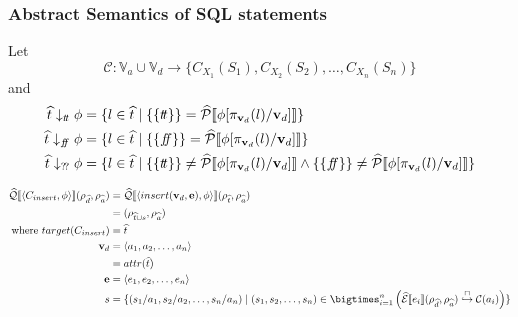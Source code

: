\subsubsection{Abstract Semantics of SQL statements}

Let
\begin{equation}
    \mathcal{C} : \mathbb{V}_a \cup \mathbb{V}_d \rightarrow \{ C_{X_1}(S_1), C_{X_2}(S_2), \dots, C_{X_n}(S_n) \}
\end{equation}
and
\begin{align}
    \abstable \downarrow_{\true} \phi &= \{ l \in \ab{t} \mid \{\{ \true \}\} = \abspredsem{\phi[\pi_{\mathbf{v}_d}(l)/\mathbf{v}_d]} \} \\
    \abstable \downarrow_{\false} \phi &= \{ l \in \ab{t} \mid \{\{ \false \}\} = \abspredsem{\phi[\pi_{\mathbf{v}_d}(l)/\mathbf{v}_d]} \} \\
    \abstable \downarrow_{\unknown} \phi &= \{ l \in \ab{t} \mid \{\{ \true \}\} \neq \abspredsem{\phi[\pi_{\mathbf{v}_d}(l)/\mathbf{v}_d]} \land \{\{ \false \}\} \neq \abspredsem{\phi[\pi_{\mathbf{v}_d}(l)/\mathbf{v}_d]}\} \\
\end{align}

\begin{align}
    \abssqlsem{\langle C_{insert}, \phi \rangle}(\rho_{\ab{d}}, \rho_{\ab{a}}) & =
    \abssqlsem{\langle insert(\mathbf{v}_d, \mathbf{e}), \phi \rangle}(\rho_{\ab{t}}, \rho_{\ab{a}})\\
    & = (\rho_{\ab{t} \cup s}, \rho_{\ab{a}}) \\
    \text{where } target(C_{insert})        & = \ab{t}                                                                                                                                                 \\
    \mathbf{v}_d              & = \langle a_1, a_2, \dots, a_n \rangle                                                                                                        \\
                                               & = attr(\ab{t})                                                                                                                                           \\
    \mathbf{e} & = \langle e_1, e_2, \dots, e_n \rangle \\
    s &= \{ (s_1/a_1, s_2/a_2, \dots, s_n/a_n) \mid (s_1, s_2, \dots, s_n) \in \bigtimes_{i = 1}^{n} \left( \absexpsem{e_i}(\rho_{\ab{d}}, \rho_{\ab{a}}) \into \lookupcl(a_i) \right) \}
\end{align}


